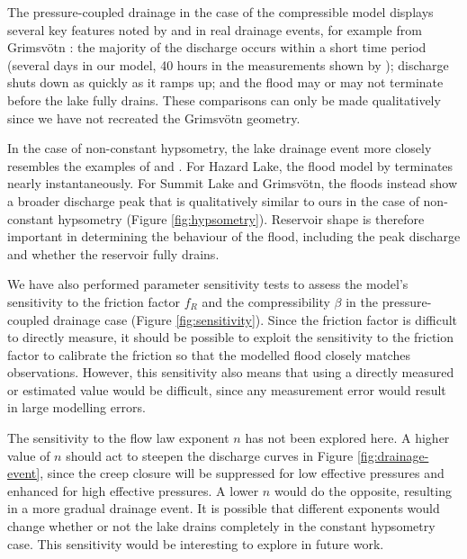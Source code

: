 \documentclass[11pt]{article}
\begin{document}
The pressure-coupled drainage in the case of the compressible model displays several key features noted by \citet{nye1976} and in real drainage events, for example from Grimsv\"otn \citep{flowers2004}: the majority of the discharge occurs within a short time period (several days in our model, 40 hours in the measurements shown by \citealt{flowers2004}); discharge shuts down as quickly as it ramps up; and the flood may or may not terminate before the lake fully drains. These comparisons can only be made qualitatively since we have not recreated the Grimsv\"otn geometry.

In the case of non-constant hypsometry, the lake drainage event more closely resembles the examples of \citet{clarke2003} and \citet{flowers2004}. For Hazard Lake, the flood model by \citet{clarke2003} terminates nearly instantaneously. For Summit Lake and Grimsv\"otn, the floods instead show a broader discharge peak that is qualitatively similar to ours in the case of non-constant hypsometry (Figure \ref{fig:hypsometry}). Reservoir shape is therefore important in determining the behaviour of the flood, including the peak discharge and whether the reservoir fully drains.

We have also performed parameter sensitivity tests to assess the model's sensitivity to the friction factor $f_R$ and the compressibility $\beta$ in the pressure-coupled drainage case (Figure \ref{fig:sensitivity}). Since the friction factor is difficult to directly measure, it should be possible to exploit the sensitivity to the friction factor to calibrate the friction so that the modelled flood closely matches observations. However, this sensitivity also means that using a directly measured or estimated value would be difficult, since any measurement error would result in large modelling errors.

The sensitivity to the flow law exponent $n$ has not been explored here. A higher value of $n$ should act to steepen the discharge curves in Figure \ref{fig:drainage-event}, since the creep closure will be suppressed for low effective pressures and enhanced for high effective pressures. A lower $n$ would do the opposite, resulting in a more gradual drainage event. It is possible that different exponents would change whether or not the lake drains completely in the constant hypsometry case. This sensitivity would be interesting to explore in future work.
\end{document}
